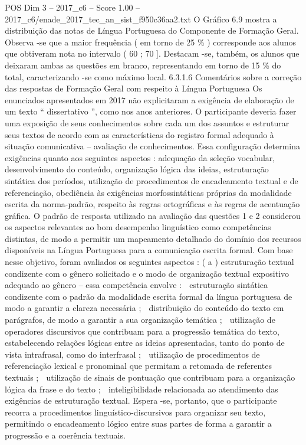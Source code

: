 \begin{textsample}{POS Dim 3 – 2017\_c6 – Score 1.00 – 2017\_c6/enade\_2017\_tec\_an\_sist\_f950c36aa2.txt}
O Gráfico 6.9 mostra a distribuição das notas de Língua Portuguesa do Componente de Formação Geral.
Observa -se que a maior frequência ( em torno de 25 \% ) corresponde aos alunos que obtiveram nota no intervalo ( 60 ; 70 ].
Destacam -se, também, os alunos que deixaram ambas as questões em branco, representando em torno de 15 \% do total, caracterizando -se como máximo local. 6.3.1.6 Comentários sobre a correção das respostas de Formação Geral com respeito à Língua Portuguesa Os enunciados apresentados em 2017 não explicitaram a exigência de elaboração de um texto “ dissertativo ”, como nos anos anteriores.
O participante deveria fazer uma exposição de seus conhecimentos sobre cada um dos assuntos e estruturar seus textos de acordo com as características do registro formal adequado à situação comunicativa – avaliação de conhecimentos.
Essa configuração determina exigências quanto aos seguintes aspectos : adequação da seleção vocabular, desenvolvimento do conteúdo, organização lógica das ideias, estruturação sintática dos períodos, utilização de procedimentos de encadeamento textual e de referenciação, obediência às exigências morfossintáticas próprias da modalidade escrita da norma-padrão, respeito às regras ortográficas e às regras de acentuação gráfica.
O padrão de resposta utilizado na avaliação das questões 1 e 2 considerou os aspectos relevantes ao bom desempenho linguístico como competências distintas, de modo a permitir um mapeamento detalhado do domínio dos recursos disponíveis na Língua Portuguesa para a comunicação escrita formal.
Com base nesse objetivo, foram avaliados os seguintes aspectos : ( a ) estruturação textual condizente com o gênero solicitado e o modo de organização textual expositivo adequado ao gênero – essa competência envolve :  estruturação sintática condizente com o padrão da modalidade escrita formal da língua portuguesa de modo a garantir a clareza necessária ;  distribuição do conteúdo do texto em parágrafos, de modo a garantir a sua organização temática ;  utilização de operadores discursivos que contribuam para a progressão temática do texto, estabelecendo relações lógicas entre as ideias apresentadas, tanto do ponto de vista intrafrasal, como do interfrasal ;  utilização de procedimentos de referenciação lexical e pronominal que permitam a retomada de referentes textuais ;  utilização de sinais de pontuação que contribuam para a organização lógica da frase e do texto ;  inteligibilidade relacionada ao atendimento das exigências de estruturação textual.
Espera -se, portanto, que o participante recorra a procedimentos linguístico-discursivos para organizar seu texto, permitindo o encadeamento lógico entre suas partes de forma a garantir a progressão e a coerência textuais.

\end{textsample}
